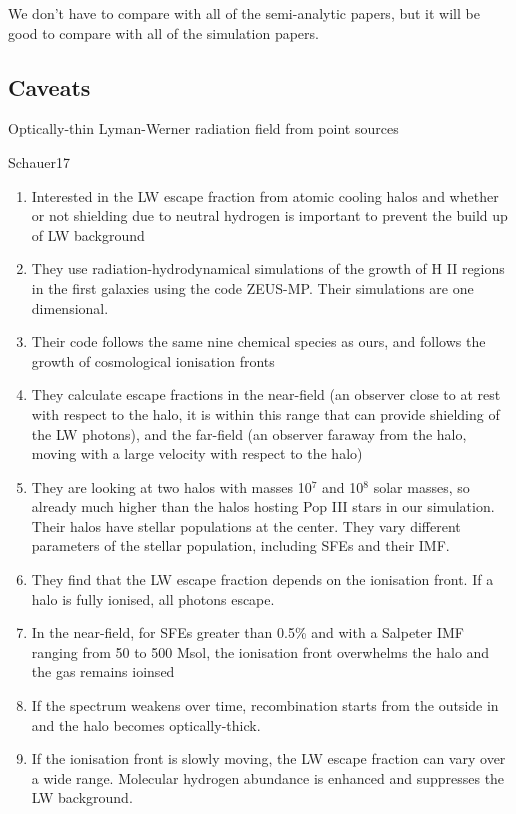 \documentclass[a4paper,fleqn,usenatbib]{mnras}
\begin{document}
\li We don't have to compare with all of the semi-analytic papers, but
it will be good to compare with all of the simulation papers.

\subsection{Caveats}

\li Optically-thin Lyman-Werner radiation field from point sources \citep{Schauer17}

\li Schauer17
\begin{enumerate}
	\item Interested in the LW escape fraction from atomic cooling halos and whether or not shielding due to neutral hydrogen is important to prevent the build up of LW background
	\item They use radiation-hydrodynamical simulations of the growth of H II regions in the first galaxies using the code ZEUS-MP. Their simulations are one dimensional. 
	\item Their code follows the same nine chemical species as ours, and follows the growth of cosmological ionisation fronts
	\item They calculate escape fractions in the near-field (an observer close to at rest with respect to the halo, it is within this range that \hh{} can provide shielding of the LW photons), and the far-field (an observer faraway from the halo, moving with a large velocity with respect to the halo)
	\item They are looking at two halos with masses 10$^{7}$ and 10$^{8}$ solar masses, so already much higher than the halos hosting Pop III stars in our simulation. Their halos have stellar populations at the center. They vary different parameters of the stellar population, including SFEs and their IMF.
	\item They find that the LW escape fraction depends on the ionisation front. If a halo is fully ionised, all photons escape.
	\item In the near-field, for SFEs greater than 0.5\% and with a Salpeter IMF ranging from 50 to 500 Msol, the ionisation front overwhelms the halo and the gas remains ioinsed
	\item If the spectrum weakens over time, recombination starts from the outside in and the halo becomes optically-thick.
	\item If the ionisation front is slowly moving, the LW escape fraction can vary over a wide range. Molecular hydrogen abundance is enhanced and suppresses the LW background.

\end{enumerate}
\end{document}
